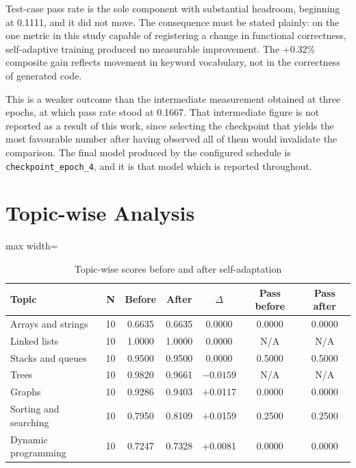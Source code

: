 \documentclass[12pt,a4paper]{report}
\begin{document}
Test-case pass rate is the sole component with substantial headroom, beginning at 0.1111, and it did not move. The consequence must be stated plainly: on the one metric in this study capable of registering a change in functional correctness, self-adaptive training produced no measurable improvement. The +0.32\% composite gain reflects movement in keyword vocabulary, not in the correctness of generated code.

This is a weaker outcome than the intermediate measurement obtained at three epochs, at which pass rate stood at 0.1667. That intermediate figure is not reported as a result of this work, since selecting the checkpoint that yields the most favourable number after having observed all of them would invalidate the comparison. The final model produced by the configured schedule is \texttt{checkpoint\_epoch\_4}, and it is that model which is reported throughout.

\section{Topic-wise Analysis}

\begin{table}[htbp]
\centering
\caption{Topic-wise scores before and after self-adaptation}
\begin{adjustbox}{max width=\textwidth}
\begin{tabular}{>{\raggedright\arraybackslash}p{3.2cm} c c c c c c}
\toprule
\textbf{Topic} & \textbf{N} & \textbf{Before} & \textbf{After} & $\Delta$ & \textbf{Pass before} & \textbf{Pass after} \\
\midrule
Arrays and strings & 10 & 0.6635 & 0.6635 & 0.0000 & 0.0000 & 0.0000 \\
Linked lists & 10 & 1.0000 & 1.0000 & 0.0000 & N/A & N/A \\
Stacks and queues & 10 & 0.9500 & 0.9500 & 0.0000 & 0.5000 & 0.5000 \\
Trees & 10 & 0.9820 & 0.9661 & $-0.0159$ & N/A & N/A \\
Graphs & 10 & 0.9286 & 0.9403 & +0.0117 & 0.0000 & 0.0000 \\
Sorting and searching & 10 & 0.7950 & 0.8109 & +0.0159 & 0.2500 & 0.2500 \\
Dynamic programming & 10 & 0.7247 & 0.7328 & +0.0081 & 0.0000 & 0.0000 \\
\bottomrule
\end{tabular}
\end{adjustbox}
\end{table}
\end{document}
